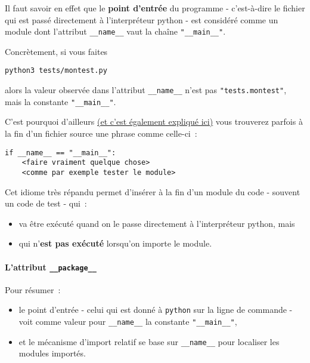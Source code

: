     Il faut savoir en effet que le \textbf{point d'entrée} du programme -
c'est-à-dire le fichier qui est passé directement à l'interpréteur
python - est considéré comme un module dont l'attribut
\texttt{\_\_name\_\_} vaut la chaîne \texttt{"\_\_main\_\_"}.

Concrètement, si vous faites

\begin{verbatim}
python3 tests/montest.py
\end{verbatim}

alors la valeur observée dans l'attribut \texttt{\_\_name\_\_} n'est pas
\texttt{"tests.montest"}, mais la constante \texttt{"\_\_main\_\_"}.

    C'est pourquoi d'ailleurs
\href{https://docs.python.org/3/tutorial/modules.html\#executing-modules-as-scripts}{(et
c'est également expliqué ici)} vous trouverez parfois à la fin d'un
fichier source une phrase comme celle-ci~:

    \begin{verbatim}
if __name__ == "__main__":
    <faire vraiment quelque chose>
    <comme par exemple tester le module>
\end{verbatim}

    Cet idiome très répandu permet d'insérer à la fin d'un module du code -
souvent un code de test - qui~:

\begin{itemize}
\tightlist
\item
  va être exécuté quand on le passe directement à l'interpréteur python,
  mais
\item
  qui n'\textbf{est pas exécuté} lorsqu'on importe le module.
\end{itemize}

    \hypertarget{lattribut-__package__}{%
\paragraph{\texorpdfstring{L'attribut
\texttt{\_\_package\_\_}}{L'attribut \_\_package\_\_}}\label{lattribut-__package__}}

    Pour résumer~:

\begin{itemize}
\tightlist
\item
  le point d'entrée - celui qui est donné à \texttt{python} sur la ligne
  de commande - voit comme valeur pour \texttt{\_\_name\_\_} la
  constante \texttt{"\_\_main\_\_"},
\item
  et le mécanisme d'import relatif se base sur \texttt{\_\_name\_\_}
  pour localiser les modules importés.
\end{itemize}

